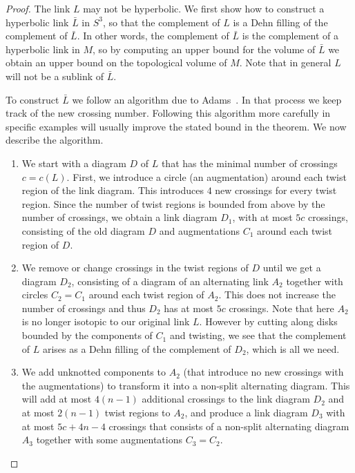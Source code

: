 \documentclass[a4paper]{gtart}
\theoremstyle{definition}
\theoremstyle{remark}
\numberwithin{equation}{section}
\begin{document}
\begin{proof}
	The link $L$ may not be hyperbolic. We first show how to construct a hyperbolic link $\bar L$ in $S^3$, so that the complement of $L$ is a Dehn filling of the complement of $\bar L$. In other words, the complement of $\bar L$ is the complement of a hyperbolic link in $M$, so by computing an upper bound for the volume of $\bar L$ we obtain an upper bound on the topological volume of $M$. Note that in general $L$ will not be a sublink of $\bar L$.
	
	To construct $\bar L$ we follow an algorithm due to Adams~\cite{Adams_Augmented}. In that process we keep track of the new crossing number. Following this algorithm more carefully in specific examples will usually improve the stated bound in the theorem. We now describe the algorithm. 
	
	\begin{enumerate}
		\item We start with a diagram $D$ of $L$ that has the minimal number of crossings $c=c(L)$. First, we introduce a circle (an augmentation) around each twist region of the link diagram. This introduces $4$ new crossings for every twist region. Since the number of twist regions is bounded from above by the number of crossings, we obtain a link diagram $D_1$, with at most $5c$ crossings, consisting of the old diagram $D$ and augmentations $C_1$ around each twist region of $D$.
		
		\item We remove or change crossings in the twist regions of $D$ until we get a diagram $D_2$, consisting of a diagram of an alternating link $A_2$ together with circles $C_2=C_1$ around each twist region of $A_2$. This does not increase the number of crossings and thus $D_2$ has at most $5c$ crossings. Note that here $A_2$ is no longer isotopic to our original link $L$. However by cutting along disks bounded by the components of $C_1$ and twisting, we see that the complement of $L$ arises as a Dehn filling of the complement of $D_2$, which is all we need.
		
		\item We add unknotted components to $A_2$ (that introduce no new crossings with the augmentations) to transform it into a non-split alternating diagram. This will add at most $4(n-1)$ additional crossings to the link diagram $D_2$ and at most $2(n-1)$ twist regions to $A_2$, and produce a link diagram $D_3$ with at most $5c+4n-4$ crossings that consists of a non-split alternating diagram $A_3$ together with some augmentations $C_3=C_2$.
		

\end{enumerate}
\end{proof}
\end{document}
